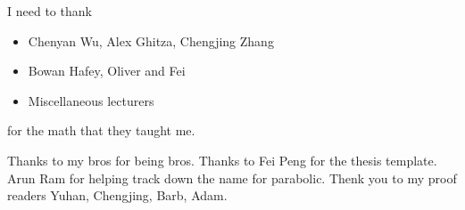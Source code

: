 I need to thank
\begin{itemize}
	\item Chenyan Wu,  Alex Ghitza,  Chengjing Zhang	
	\item Bowan Hafey, Oliver and Fei
    \item Miscellaneous lecturers
\end{itemize}
for the math that they taught me. 

Thanks to my bros for being bros. Thanks to Fei Peng for the thesis template. Arun Ram for helping track down the name for parabolic. Thenk  you to my proof readers Yuhan, Chengjing, Barb, Adam.
